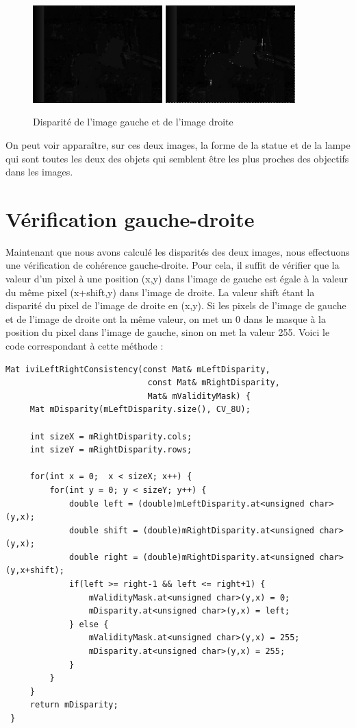 \documentclass[a4paper,10pt]{article}
\begin{document}
\begin{figure}[!h]
 \centering
 \includegraphics[width=5cm]{leftDisparity.png}
 \includegraphics[width=5cm]{rightDisparity.png}
 \caption{Disparité de l'image gauche et de l'image droite}
\end{figure}
On peut voir apparaître, sur ces deux images, la forme de la statue et de la lampe qui sont
toutes les deux des objets qui semblent être les plus proches des objectifs dans les images.

\section{Vérification gauche-droite}
Maintenant que nous avons calculé les disparités des deux images, nous effectuons une vérification
de cohérence gauche-droite. Pour cela, il suffit de vérifier que la valeur d'un pixel à une position (x,y)
dans l'image de gauche est égale à la valeur du même pixel (x+shift,y) dans l'image de droite. La valeur
shift étant la disparité du pixel de l'image de droite en (x,y). Si les pixels de l'image de gauche et de 
l'image de droite ont la même valeur, on met un 0 dans le masque à la position du pixel dans l'image de gauche,
sinon on met la valeur 255. Voici le code correspondant à cette méthode :
\begin{lstlisting}[caption=Vérification de cohérence gauche-droite]
Mat iviLeftRightConsistency(const Mat& mLeftDisparity,
                             const Mat& mRightDisparity,
                             Mat& mValidityMask) {
     Mat mDisparity(mLeftDisparity.size(), CV_8U);
 
     int sizeX = mRightDisparity.cols;
     int sizeY = mRightDisparity.rows;
 
     for(int x = 0;  x < sizeX; x++) {
         for(int y = 0; y < sizeY; y++) {
             double left = (double)mLeftDisparity.at<unsigned char>(y,x);
             double shift = (double)mRightDisparity.at<unsigned char>(y,x);
             double right = (double)mRightDisparity.at<unsigned char>(y,x+shift);
             if(left >= right-1 && left <= right+1) {
                 mValidityMask.at<unsigned char>(y,x) = 0;
                 mDisparity.at<unsigned char>(y,x) = left;
             } else {
                 mValidityMask.at<unsigned char>(y,x) = 255;
                 mDisparity.at<unsigned char>(y,x) = 255;
             }
         }
     }
     return mDisparity;
 }
\end{lstlisting}
\end{document}
